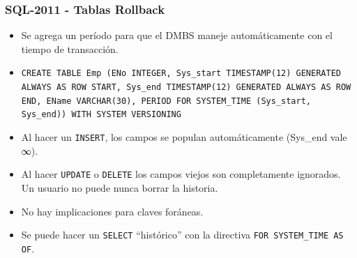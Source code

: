 \begin{frame}
\frametitle{SQL-2011 - Tablas Rollback}
	\begin{itemize}
	\item	Se agrega un período para que el DMBS maneje automáticamente
		con el tiempo de transacción.
	\pause

	\item	\texttt{CREATE TABLE Emp (ENo INTEGER, Sys\_start
		TIMESTAMP(12) GENERATED ALWAYS AS ROW START,
		Sys\_end TIMESTAMP(12) GENERATED ALWAYS AS ROW
		END, EName VARCHAR(30), PERIOD FOR SYSTEM\_TIME
		(Sys\_start, Sys\_end)) WITH SYSTEM VERSIONING}
	\pause

	\item	Al hacer un \texttt{INSERT}, los campos se populan automáticamente
		(Sys\_end vale ∞).
	\pause

	\item	Al hacer \texttt{UPDATE} o \texttt{DELETE} los campos viejos
		son completamente ignorados. Un usuario no puede nunca borrar
		la historia.
	\pause

	\item	No hay implicaciones para claves foráneas.
	\pause

	\item	Se puede hacer un \texttt{SELECT} ``histórico'' con la directiva
		\texttt{FOR SYSTEM\_TIME AS OF}.

	\end{itemize}
\end{frame}
